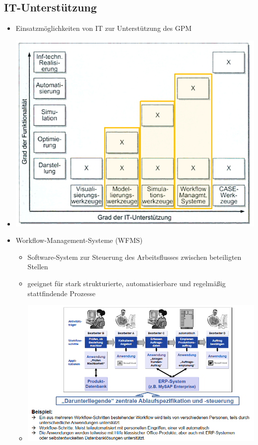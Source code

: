 \documentclass[11pt,a4paper]{article}
\begin{document}
\subsection{IT-Unterstützung}
\begin{itemize}
\item Einsatzmöglichkeiten von IT zur Unterstützung des GPM
\item[] \includegraphics[width=15cm]{Bilder/itsup}
\item Workflow-Management-Systeme (WFMS)
	\begin{itemize}
	\item Software-System zur Steuerung des Arbeitsflusses zwischen beteiligten Stellen
	\item geeignet für stark strukturierte, automatisierbare und regelmäßig stattfindende Prozesse 
	\item[] \includegraphics[width=15cm]{Bilder/wfms}
	\end{itemize}
\end{itemize}
\end{document}
